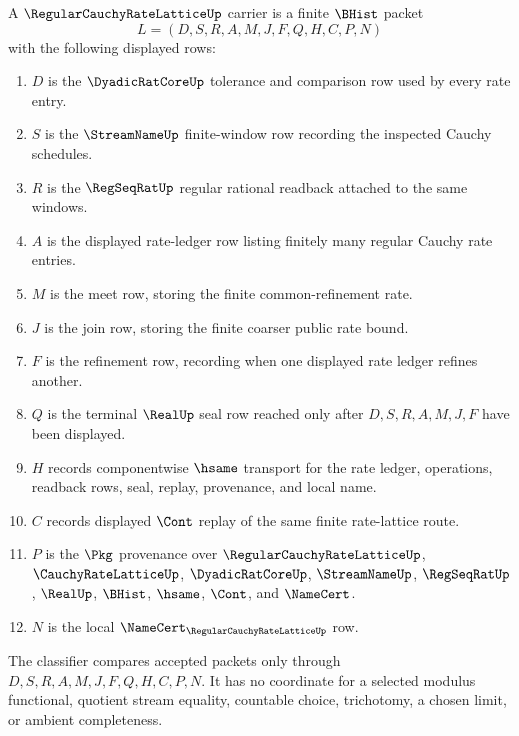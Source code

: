 \begin{definition}
\label{def:regular-cauchy-rate-lattice-carrier}
A $\RegularCauchyRateLatticeUp$ carrier is a finite $\BHist$ packet
$$
L=(D,S,R,A,M,J,F,Q,H,C,P,N)
$$
with the following displayed rows:
\begin{enumerate}
\item $D$ is the $\DyadicRatCoreUp$ tolerance and comparison row used by every rate entry.
\item $S$ is the $\StreamNameUp$ finite-window row recording the inspected Cauchy schedules.
\item $R$ is the $\RegSeqRatUp$ regular rational readback attached to the same windows.
\item $A$ is the displayed rate-ledger row listing finitely many regular Cauchy rate entries.
\item $M$ is the meet row, storing the finite common-refinement rate.
\item $J$ is the join row, storing the finite coarser public rate bound.
\item $F$ is the refinement row, recording when one displayed rate ledger refines another.
\item $Q$ is the terminal $\RealUp$ seal row reached only after $D,S,R,A,M,J,F$ have been displayed.
\item $H$ records componentwise $\hsame$ transport for the rate ledger, operations, readback rows, seal, replay, provenance, and local name.
\item $C$ records displayed $\Cont$ replay of the same finite rate-lattice route.
\item $P$ is the $\Pkg$ provenance over $\RegularCauchyRateLatticeUp$, $\CauchyRateLatticeUp$, $\DyadicRatCoreUp$, $\StreamNameUp$, $\RegSeqRatUp$, $\RealUp$, $\BHist$, $\hsame$, $\Cont$, and $\NameCert$.
\item $N$ is the local $\NameCert_{\RegularCauchyRateLatticeUp}$ row.
\end{enumerate}
The classifier compares accepted packets only through $D,S,R,A,M,J,F,Q,H,C,P,N$. It has no coordinate for a selected modulus functional, quotient stream equality, countable choice, trichotomy, a chosen limit, or ambient completeness.
\end{definition}

